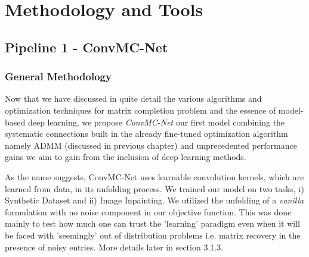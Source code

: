 
\chapter{Methodology and Tools} %
\label{Chapter3}
\lhead{} %

\section{Pipeline 1 - ConvMC-Net}
\subsection{General Methodology}
Now that we have discussed in quite detail the various algorithms and optimization techniques for matrix completion problem and the essence of model-based deep learning, we propose \textit{ConvMC-Net} our first model combining the systematic connections built in the already fine-tuned optimization algorithm namely ADMM (discussed in previous chapter) and unprecedented performance gains we aim to gain from the inclusion of deep learning methods. 

As the name suggests, ConvMC-Net uses learnable convolution kernels, which are learned from data, in its unfolding process. We trained our model on two tasks, i) Synthetic Dataset and ii) Image Inpainting. We utilized the unfolding of a \textit{vanilla} formulation with no noise component in our objective function. This was done mainly to test how much one can trust the 'learning' paradigm even when it will be faced with 'seemingly' out of distribution problems i.e. matrix recovery in the presence of noisy entries. More details later in section 3.1.3.

